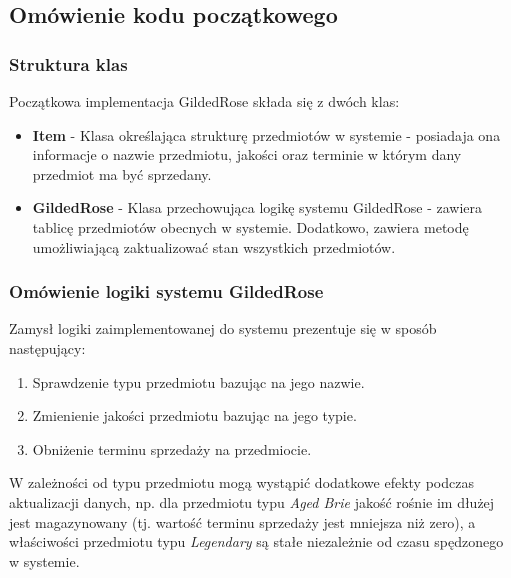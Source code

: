 \documentclass[a4paper, 11pt]{article}
\begin{document}
\subsection{Omówienie kodu początkowego}
\subsubsection{Struktura klas}
Początkowa implementacja GildedRose składa się z dwóch klas:
\begin{itemize}
 \item \textbf{Item} - Klasa określająca strukturę przedmiotów w systemie - posiadaja ona informacje o nazwie przedmiotu, jakości oraz terminie w którym dany przedmiot ma być sprzedany.
 \item \textbf{GildedRose} - Klasa przechowująca logikę systemu GildedRose - zawiera tablicę przedmiotów obecnych w systemie. Dodatkowo, zawiera metodę umożliwiającą zaktualizować stan wszystkich przedmiotów.
\end{itemize}
\subsubsection{Omówienie logiki systemu GildedRose}
Zamysł logiki zaimplementowanej do systemu prezentuje się w sposób następujący:
\begin{enumerate}
 \item Sprawdzenie typu przedmiotu bazując na jego nazwie.
 \item Zmienienie jakości przedmiotu bazując na jego typie.
 \item Obniżenie terminu sprzedaży na przedmiocie.
\end{enumerate}
W zależności od typu przedmiotu mogą wystąpić dodatkowe efekty podczas aktualizacji danych, np. dla przedmiotu typu \textit{Aged Brie} jakość rośnie im dłużej jest magazynowany (tj. wartość terminu sprzedaży jest mniejsza niż zero), a właściwości przedmiotu typu \textit{Legendary} są stałe niezależnie od czasu spędzonego w systemie.
\end{document}
